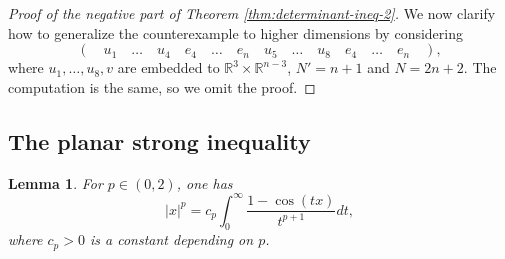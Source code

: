 \documentclass[11pt,a4paper]{amsart}
\theoremstyle{plain}
\newtheorem{lemma}[theorem]{Lemma}
\theoremstyle{definition}
\newcommand{\R}{\mathbb R}
\begin{document}
\begin{proof}[Proof of the negative part of Theorem \ref{thm:determinant-ineq-2}]
We now clarify how to generalize the counterexample to higher dimensions by considering 
$$
    (\quad u_1 \quad \ldots \quad u_4 \quad e_4 \quad \ldots \quad e_n \quad u_5 \quad \ldots \quad u_8 \quad e_4 \quad \ldots \quad e_n \quad ),
$$
where $u_1,\ldots,u_8,v$ are embedded to $\R^3 \times \R^{n-3}$, $N' = n+1$ and $N = 2n+2$. The computation is the same, so we omit the proof. \qedhere

\end{proof}
\subsection{The planar strong inequality}
\label{sec:affirmative-cases}
\begin{lemma} \label{lem:laplace}
    For $p \in (0,2)$, one has 
    \[
        |x|^p = c_p \int_{0}^\infty \frac{1 - \cos (tx)}{t^{p+1}} dt,
    \]
    where $c_p >0$ is a constant depending on $p$.
\end{lemma}
\end{document}
